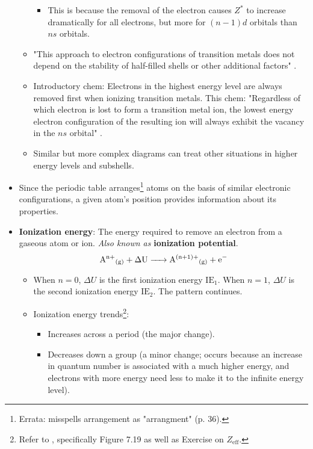 \documentclass[../notes.tex]{subfiles}
\begin{document}
\begin{itemize}
\begin{itemize}
\begin{itemize}
            \item This is because the removal of the electron causes $Z^*$ to increase dramatically for all electrons, but more for $(n-1)d$ orbitals than $ns$ orbitals.
        \end{itemize}
        \item "This approach to electron configurations of transition metals does not depend on the stability of half-filled shells or other additional factors" \parencite[36]{bib:MiesslerFischerTarr}.
        \item Introductory chem: Electrons in the highest energy level are always removed first when ionizing transition metals. This chem: "Regardless of which electron is lost to form a transition metal ion, the lowest energy electron configuration of the resulting ion will always exhibit the vacancy in the $ns$ orbital" \parencite[36]{bib:MiesslerFischerTarr}.
        \item Similar but more complex diagrams can treat other situations in higher energy levels and subshells.
    \end{itemize}
    \item Since the periodic table arranges\footnote{Errata: \textcite{bib:MiesslerFischerTarr} misspells arrangement as "arrangment" (p. 36).} atoms on the basis of similar electronic configurations, a given atom's position provides information about its properties.
    \item \textbf{Ionization energy}: The energy required to remove an electron from a gaseous atom or ion. \emph{Also known as} \textbf{ionization potential}.
    \begin{equation*}
        \ce{{A^{n+}}_{(g)} + \Delta U -> {A^{(n+1)+}}_{(g)} + e-}
    \end{equation*}
    \begin{itemize}
        \item When $n=0$, $\Delta U$ is the first ionization energy $\text{IE}_1$. When $n=1$, $\Delta U$ is the second ionization energy $\text{IE}_2$. The pattern continues.
        \item Ionization energy trends\footnote{Refer to \textcite{bib:APChemNotes}, specifically Figure 7.19 as well as Exercise on $Z_\text{eff}$.}:
        \begin{itemize}
            \item Increases across a period (the major change).
            \item Decreases down a group (a minor change; occurs because an increase in quantum number is associated with a much higher energy, and electrons with more energy need less to make it to the infinite energy level).

\end{itemize}
\end{itemize}
\end{itemize}
\end{document}
